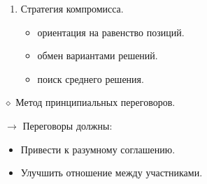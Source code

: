 \documentclass[12pt,a4paper]{report}
\begin{document}
\begin{enumerate}
	\item Стратегия компромисса.
	\begin{itemize}
		\item ориентация на равенство позиций.
		\item обмен вариантами решений.
		\item поиск среднего решения.
	\end{itemize}
\end{enumerate}

\bigskip
$\diamond$ Метод принципиальных переговоров.

\medskip
$\rightarrow$ Переговоры должны:
\begin{itemize}
	\item Привести к разумному соглашению.
	\item Улучшить отношение между участниками.
\end{itemize}
\end{document}
